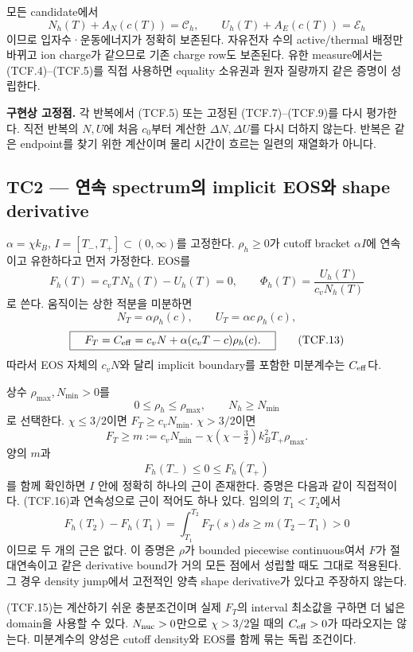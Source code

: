 모든 candidate에서 \[
N_h(T)+A_N(c(T))=\mathscr C_h,\qquad
U_h(T)+A_E(c(T))=\mathscr E_h
\tag{TCF.10}
\] 이므로 입자수·운동에너지가 정확히 보존된다. 자유전자 수의 active/thermal 배정만 바뀌고 ion charge가 같으므로 기존 charge row도 보존된다. 유한 measure에서는 (TCF.4)--(TCF.5)를 직접 사용하면 equality 소유권과 원자 질량까지 같은 증명이 성립한다.

\textbf{구현상 고정점.} 각 반복에서 (TCF.5) 또는 고정된 (TCF.7)--(TCF.9)를 다시 평가한다. 직전 반복의 \(N,U\)에 처음 \(c_0\)부터 계산한 \(\Delta N,\Delta U\)를 다시 더하지 않는다. 반복은 같은 endpoint를 찾기 위한 계산이며 물리 시간이 흐르는 일련의 재열화가 아니다.

\hypertarget{tc2-uxc5f0uxc18d-spectrumuxc758-implicit-eosuxc640-shape-derivative}{%
\subsection{TC2 --- 연속 spectrum의 implicit EOS와 shape derivative}\label{tc2-uxc5f0uxc18d-spectrumuxc758-implicit-eosuxc640-shape-derivative}}

\(\alpha=\chi k_B\), \(I=[T_-,T_+]\subset(0,\infty)\)를 고정한다. \(\rho_h\ge0\)가 cutoff bracket \(\alpha I\)에 연속이고 유한하다고 먼저 가정한다. EOS를 \[
F_h(T)=c_vT\,N_h(T)-U_h(T)=0,\qquad
\Phi_h(T)=\frac{U_h(T)}{c_vN_h(T)}
\tag{TCF.11}
\] 로 쓴다. 움직이는 상한 적분을 미분하면 \[
N_T=\alpha\rho_h(c),\qquad
U_T=\alpha c\,\rho_h(c),
\tag{TCF.12}
\] \[
\boxed{\quad
F_T=C_{\rm eff}=c_vN+\alpha(c_vT-c)\rho_h(c).
\quad}
\tag{TCF.13}
\] 따라서 EOS 자체의 \(c_vN\)와 달리 implicit boundary를 포함한 미분계수는 \(C_{\rm eff}\)다.

상수 \(\rho_{\max},N_{\min}>0\)를 \[
0\le\rho_h\le\rho_{\max},\qquad N_h\ge N_{\min}
\tag{TCF.14}
\] 로 선택한다. \(\chi\le3/2\)이면 \(F_T\ge c_vN_{\min}\). \(\chi>3/2\)이면 \[
F_T\ge m:=
c_vN_{\min}
-\chi(\chi-\tfrac32)k_B^2T_+\rho_{\max}.
\tag{TCF.15}
\] 양의 \(m\)과 \[
F_h(T_-)\le0\le F_h(T_+)
\tag{TCF.16}
\] 를 함께 확인하면 \(I\) 안에 정확히 하나의 근이 존재한다. 증명은 다음과 같이 직접적이다. (TCF.16)과 연속성으로 근이 적어도 하나 있다. 임의의 \(T_1<T_2\)에서 \[
F_h(T_2)-F_h(T_1)=\int_{T_1}^{T_2}F_T(s)ds\ge m(T_2-T_1)>0
\tag{TCF.17}
\] 이므로 두 개의 근은 없다. 이 증명은 \(\rho\)가 bounded piecewise continuous여서 \(F\)가 절대연속이고 같은 derivative bound가 거의 모든 점에서 성립할 때도 그대로 적용된다. 그 경우 density jump에서 고전적인 양측 shape derivative가 있다고 주장하지 않는다.

(TCF.15)는 계산하기 쉬운 충분조건이며 실제 \(F_T\)의 interval 최소값을 구하면 더 넓은 domain을 사용할 수 있다. \(N_{\rm nuc}>0\)만으로 \(\chi>3/2\)일 때의 \(C_{\rm eff}>0\)가 따라오지는 않는다. 미분계수의 양성은 cutoff density와 EOS를 함께 묶는 독립 조건이다.

